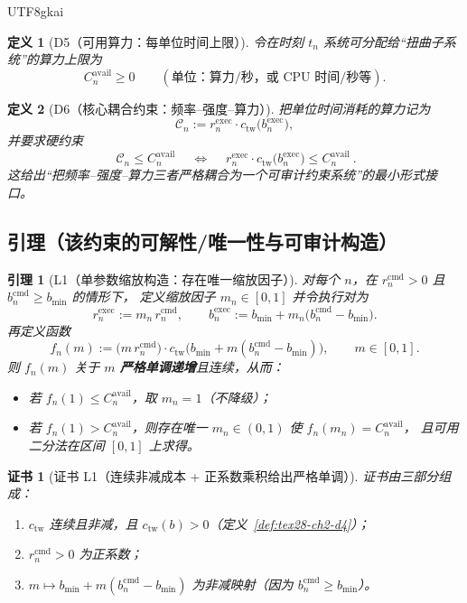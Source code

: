 \documentclass[12pt]{article}
\newtheorem{definition}{定义}[section]
\newtheorem{lemma}{引理}[section]
\newtheorem{Certificate}{证书}[section]
\begin{document}
\begin{CJK*}{UTF8}{gkai}
\begin{definition}[D5（可用算力：每单位时间上限）]
\label{def:tex28-ch2-d5}
令在时刻 $t_n$ 系统可分配给“扭曲子系统”的算力上限为
\[
  C^{\mathrm{avail}}_n\ge 0
  \qquad(\text{单位：算力/秒，或 CPU 时间/秒等}).
\]
\end{definition}

\begin{definition}[D6（核心耦合约束：频率--强度--算力）]
\label{def:tex28-ch2-d6}
把单位时间消耗的算力记为
\[
  \mathcal{C}_n := r^{\mathrm{exec}}_n\cdot c_{\mathrm{tw}}\bigl(b^{\mathrm{exec}}_n\bigr),
\]
并要求硬约束
\[
  \boxed{\ \mathcal{C}_n \le C^{\mathrm{avail}}_n\ }
  \quad\Longleftrightarrow\quad
  \boxed{\ r^{\mathrm{exec}}_n\cdot c_{\mathrm{tw}}\bigl(b^{\mathrm{exec}}_n\bigr)\le C^{\mathrm{avail}}_n\ }.
\]
这给出“把频率--强度--算力三者严格耦合为一个可审计约束系统”的最小形式接口。
\end{definition}

\subsection{引理（该约束的可解性/唯一性与可审计构造）}
\label{subsec:tex28-ch2-lemmas}

\begin{lemma}[L1（单参数缩放构造：存在唯一缩放因子）]
\label{lem:tex28-ch2-l1}
对每个 $n$，在 $r^{\mathrm{cmd}}_n>0$ 且 $b^{\mathrm{cmd}}_n\ge b_{\min}$ 的情形下，
定义缩放因子 $m_n\in[0,1]$ 并令执行对为
\[
  r^{\mathrm{exec}}_n := m_n\,r^{\mathrm{cmd}}_n,
  \qquad
  b^{\mathrm{exec}}_n := b_{\min} + m_n\bigl(b^{\mathrm{cmd}}_n-b_{\min}\bigr).
\]
再定义函数
\[
  f_n(m):=\bigl(m\,r^{\mathrm{cmd}}_n\bigr)\cdot
  c_{\mathrm{tw}}\!\bigl(b_{\min}+m(b^{\mathrm{cmd}}_n-b_{\min})\bigr),
  \qquad m\in[0,1].
\]
则 $f_n(m)$ 关于 $m$ \textbf{严格单调递增}且连续，从而：
\begin{itemize}
  \item 若 $f_n(1)\le C^{\mathrm{avail}}_n$，取 $m_n=1$（不降级）；
  \item 若 $f_n(1)> C^{\mathrm{avail}}_n$，则存在唯一 $m_n\in(0,1)$ 使 $f_n(m_n)=C^{\mathrm{avail}}_n$，
  且可用二分法在区间 $[0,1]$ 上求得。
\end{itemize}
\end{lemma}

\begin{Certificate}[证书 L1（连续非减成本 + 正系数乘积给出严格单调）]
\label{cert:tex28-ch2-l1}
证书由三部分组成：
\begin{enumerate}
  \item $c_{\mathrm{tw}}$ 连续且非减，且 $c_{\mathrm{tw}}(b)>0$（定义~\ref{def:tex28-ch2-d4}）；
  \item $r^{\mathrm{cmd}}_n>0$ 为正系数；
  \item $m\mapsto b_{\min}+m(b^{\mathrm{cmd}}_n-b_{\min})$ 为非减映射（因为 $b^{\mathrm{cmd}}_n\ge b_{\min}$）。
\end{enumerate}
\end{Certificate}


\end{CJK*}
\end{document}
